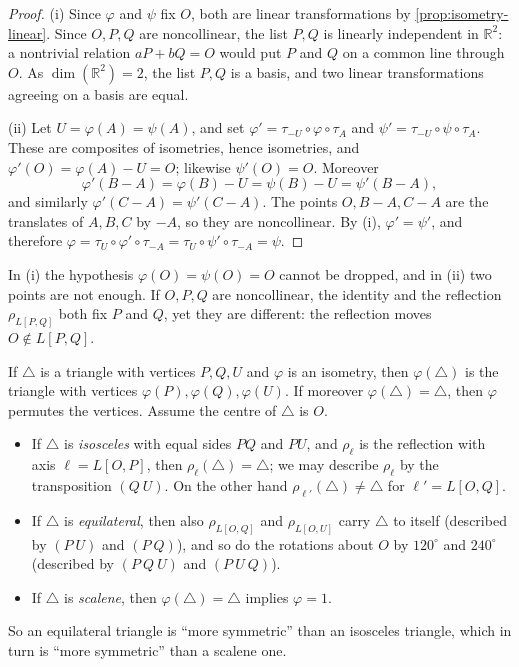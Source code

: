 \begin{proof}
	(i) Since \(\varphi\) and \(\psi\) fix \(O\), both are linear transformations by
	\autoref{prop:isometry-linear}. Since \(O, P, Q\) are noncollinear, the list \(P, Q\)
	is linearly independent in \(\mathbb{R}^2\): a nontrivial relation \(aP + bQ = O\)
	would put \(P\) and \(Q\) on a common line through \(O\). As
	\(\dim(\mathbb{R}^2) = 2\), the list \(P, Q\) is a basis, and two linear
	transformations agreeing on a basis are equal.

	(ii) Let \(U = \varphi(A) = \psi(A)\), and set
	\(\varphi' = \tau_{-U}\circ\varphi\circ\tau_A\) and
	\(\psi' = \tau_{-U}\circ\psi\circ\tau_A\). These are composites of isometries, hence
	isometries, and \(\varphi'(O) = \varphi(A) - U = O\); likewise \(\psi'(O) = O\).
	Moreover
	\[
		\varphi'(B - A) = \varphi(B) - U = \psi(B) - U = \psi'(B - A),
	\]
	and similarly \(\varphi'(C - A) = \psi'(C - A)\). The points \(O, B - A, C - A\) are the
	translates of \(A, B, C\) by \(-A\), so they are noncollinear. By (i),
	\(\varphi' = \psi'\), and therefore
	\(\varphi = \tau_U\circ\varphi'\circ\tau_{-A} = \tau_U\circ\psi'\circ\tau_{-A} = \psi\).
\end{proof}

\begin{remark}
	In (i) the hypothesis \(\varphi(O) = \psi(O) = O\) cannot be dropped, and in (ii) two
	points are not enough. If \(O, P, Q\) are noncollinear, the identity and the reflection
	\(\rho_{L[P,Q]}\) both fix \(P\) and \(Q\), yet they are different: the reflection moves
	\(O \notin L[P,Q]\).
\end{remark}

\begin{eg}[Triangles]\label{eg:triangles}
	If \(\triangle\) is a triangle with vertices \(P, Q, U\) and \(\varphi\) is an isometry,
	then \(\varphi(\triangle)\) is the triangle with vertices
	\(\varphi(P), \varphi(Q), \varphi(U)\). If moreover \(\varphi(\triangle) = \triangle\),
	then \(\varphi\) permutes the vertices. Assume the centre of \(\triangle\) is \(O\).
	\begin{itemize}
		\item If \(\triangle\) is \emph{isosceles} with equal sides \(PQ\) and \(PU\), and
		      \(\rho_\ell\) is the reflection with axis \(\ell = L[O,P]\), then
		      \(\rho_\ell(\triangle) = \triangle\); we may describe \(\rho_\ell\) by the
		      transposition \((Q\ U)\). On the other hand
		      \(\rho_{\ell'}(\triangle) \neq \triangle\) for \(\ell' = L[O,Q]\).
		\item If \(\triangle\) is \emph{equilateral}, then also
		      \(\rho_{L[O,Q]}\) and \(\rho_{L[O,U]}\) carry \(\triangle\) to itself
		      (described by \((P\ U)\) and \((P\ Q)\)), and so do the rotations about \(O\)
		      by \(120^\circ\) and \(240^\circ\) (described by \((P\ Q\ U)\) and
		      \((P\ U\ Q)\)).
		\item If \(\triangle\) is \emph{scalene}, then \(\varphi(\triangle) = \triangle\)
		      implies \(\varphi = 1\).
	\end{itemize}
	So an equilateral triangle is ``more symmetric'' than an isosceles triangle, which in
	turn is ``more symmetric'' than a scalene one.
\end{eg}

